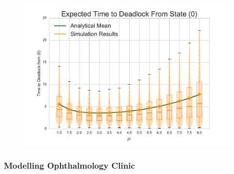 \documentclass{beamer}
\begin{document}
\begin{frame}
\begin{figure}
    \includegraphics[width=\textwidth]{varymu_1Nms}
\end{figure}
\end{frame}

\begin{frame}
\frametitle{Modelling Ophthalmology Clinic}
\begin{figure}
    
\end{figure}
\end{frame}
\end{document}
